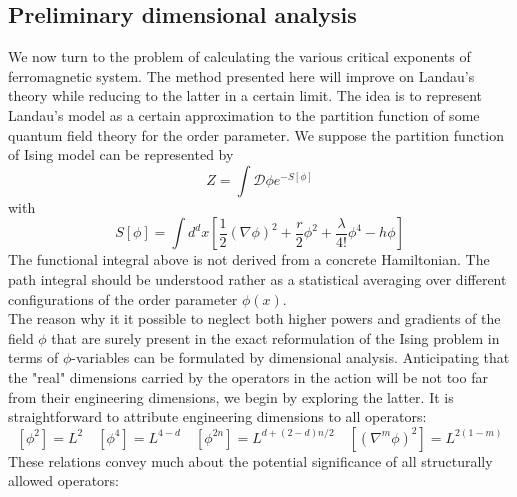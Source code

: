 \subsection{Preliminary dimensional analysis}
We now turn to the problem of calculating the various critical exponents of ferromagnetic system. The method presented here will improve on Landau's theory while reducing to the latter in a certain limit. The idea is to represent Landau's model as a certain approximation to the partition function of some quantum field theory for the order parameter. 
We suppose the partition function of Ising model can be represented by
\[Z = \int \mathcal{D}\phi e^{-S[\phi]}\]
with 
\[S[\phi] = \int d^d x \left[\frac{1}{2}(\nabla \phi)^2 + \frac{r}{2}\phi^2 + \frac{\lambda}{4!}\phi^4 - h\phi \right]\]
The functional integral above is not derived from a concrete Hamiltonian. The path integral should be understood rather as a statistical averaging over different configurations of the order parameter $\phi(x)$. 
\\
The reason why it it possible to neglect both higher powers and gradients of the field $\phi$ that are surely present in the exact reformulation of the Ising problem in terms of $\phi$-variables can be formulated by dimensional analysis.
Anticipating that the "real" dimensions carried by the operators in the action will be not too far from their
engineering dimensions, we begin by exploring the latter. 
It is straightforward to attribute engineering dimensions to all operators:
\[\left[\phi^2 \right] = L^2 \quad \left[\phi^4 \right] = L^{4-d} \quad \left[\phi^{2n} \right] = L^{d + (2-d)n/2} \quad  \left[(\nabla^m \phi)^2 \right] = L^{2(1-m)}\]
These relations convey much about the potential significance of all structurally allowed operators:
